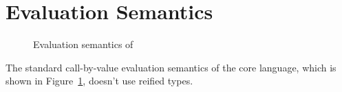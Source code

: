 \section{Evaluation Semantics}
\label{sec:evaluation}

\begin{figure}[h]
    \footnotesize
    
    \caption{Evaluation semantics of \langname}
    \label{fig:semantics}
\end{figure}
    
The standard call-by-value evaluation semantics of the core language, which
is shown in Figure~\ref{fig:semantics}, doesn't use reified types.